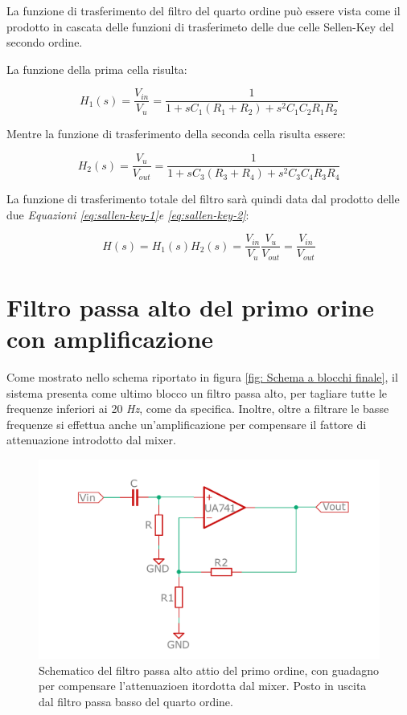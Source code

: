 \documentclass[titlepage]{report}
\begin{document}
	La funzione di trasferimento del filtro del quarto ordine può essere vista come il prodotto in cascata delle funzioni di trasferimeto delle due celle Sellen-Key del secondo ordine.

	La funzione della prima cella risulta:

	\begin{equation}
		\label{eq:sallen-key-1}
		H_1(s) = \frac{V_{in}}{V_u}  =  \frac{1}{1 + sC_1(R_1 + R_2)+ s^2C_1C_2R_1R_2 } 
	\end{equation}

	Mentre la funzione di trasferimento della seconda cella risulta essere:

	\begin{equation}
		\label{eq:sallen-key-2}
		H_2(s) = \frac{V_u}{V_{out}}  = \frac{1}{1 + sC_3(R_3 + R_4)+ s^2C_3C_4R_3R_4 } 
	\end{equation}

	La funzione di trasferimento totale del filtro sarà quindi data dal prodotto delle due \textit{Equazioni \ref{eq:sallen-key-1}e \ref{eq:sallen-key-2}}:

	\begin{equation}
		H(s) = H_1(s)H_2(s) =  \frac{V_{in}}{V_u}\frac{V_u}{V_{out}} = \frac{V_{in}}{V_{out}}
	\end{equation}

	\section{Filtro passa alto del primo orine con amplificazione}
	\label{sc: pasas alto teoria}
	Come mostrato nello schema riportato in figura \ref{fig: Schema a blocchi finale}, il sistema presenta come ultimo blocco un filtro passa alto, per tagliare tutte le frequenze inferiori ai 20 \textit{Hz}, come da specifica. Inoltre, oltre a filtrare le basse frequenze si effettua anche un'amplificazione per compensare il fattore di attenuazione introdotto dal mixer.
	\begin{figure}[H]
		\centering
		\includegraphics[scale=0.4]{Immagini/sch_hp1_no_valori.pdf}
		\caption{Schematico del filtro passa alto attio del primo ordine, con guadagno per compensare l'attenuazioen itordotta dal mixer. Posto in uscita dal filtro passa basso del quarto ordine.}
		\label{fig:FiltroH1Pnoval}
	\end{figure}
\end{document}
